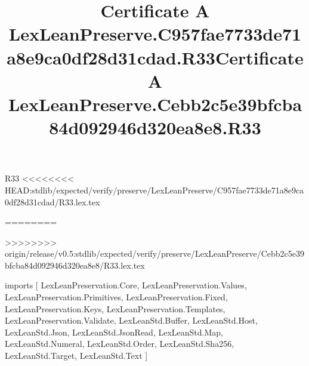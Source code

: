 \begin{lexlean}{R33}
<<<<<<<< HEAD:stdlib/expected/verify/preserve/LexLeanPreserve/C957fae7733de71a8e9ca0df28d31cdad/R33.lex.tex
\title{Certificate A LexLeanPreserve.C957fae7733de71a8e9ca0df28d31cdad.R33}
========
\title{Certificate A LexLeanPreserve.Cebb2c5e39bfcba84d092946d320ea8e8.R33}
>>>>>>>> origin/release/v0.5:stdlib/expected/verify/preserve/LexLeanPreserve/Cebb2c5e39bfcba84d092946d320ea8e8/R33.lex.tex
\begin{coremodule}
imports [
  LexLeanPreservation.Core,
  LexLeanPreservation.Values,
  LexLeanPreservation.Primitives,
  LexLeanPreservation.Fixed,
  LexLeanPreservation.Keys,
  LexLeanPreservation.Templates,
  LexLeanPreservation.Validate,
  LexLeanStd.Buffer,
  LexLeanStd.Host,
  LexLeanStd.Json,
  LexLeanStd.JsonRead,
  LexLeanStd.Map,
  LexLeanStd.Numeral,
  LexLeanStd.Order,
  LexLeanStd.Sha256,
  LexLeanStd.Target,
  LexLeanStd.Text
]


\end{coremodule}
\end{lexlean}
